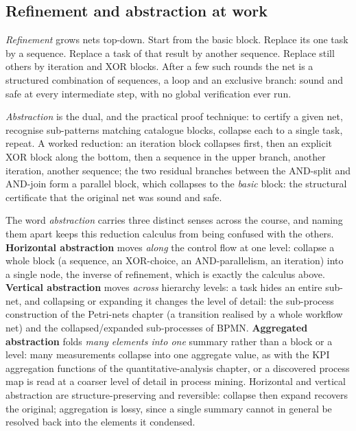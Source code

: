 \subsection{Refinement and abstraction at work}

\emph{Refinement} grows nets top-down. Start from the basic block. Replace its one task by a sequence. Replace a task of that result by another sequence. Replace still others by iteration and XOR blocks. After a few such rounds the net is a structured combination of sequences, a loop and an exclusive branch: sound and safe at every intermediate step, with no global verification ever run.

\emph{Abstraction} is the dual, and the practical proof technique: to certify a given net, recognise sub-patterns matching catalogue blocks, collapse each to a single task, repeat. A worked reduction: an iteration block collapses first, then an explicit XOR block along the bottom, then a sequence in the upper branch, another iteration, another sequence; the two residual branches between the AND-split and AND-join form a parallel block, which collapses to the \emph{basic} block: the structural certificate that the original net was sound and safe.
\par\smallskip
The word \emph{abstraction} carries three distinct senses across the course, and naming them apart keeps this reduction calculus from being confused with the others. \textbf{Horizontal abstraction} moves \emph{along} the control flow at one level: collapse a whole block (a sequence, an XOR-choice, an AND-parallelism, an iteration) into a single node, the inverse of refinement, which is exactly the calculus above. \textbf{Vertical abstraction} moves \emph{across} hierarchy levels: a task hides an entire sub-net, and collapsing or expanding it changes the level of detail: the sub-process construction of the Petri-nets chapter (a transition realised by a whole workflow net) and the collapsed/expanded sub-processes of BPMN. \textbf{Aggregated abstraction} folds \emph{many elements into one} summary rather than a block or a level: many measurements collapse into one aggregate value, as with the KPI aggregation functions of the quantitative-analysis chapter, or a discovered process map is read at a coarser level of detail in process mining. Horizontal and vertical abstraction are structure-preserving and reversible: collapse then expand recovers the original; aggregation is lossy, since a single summary cannot in general be resolved back into the elements it condensed.

